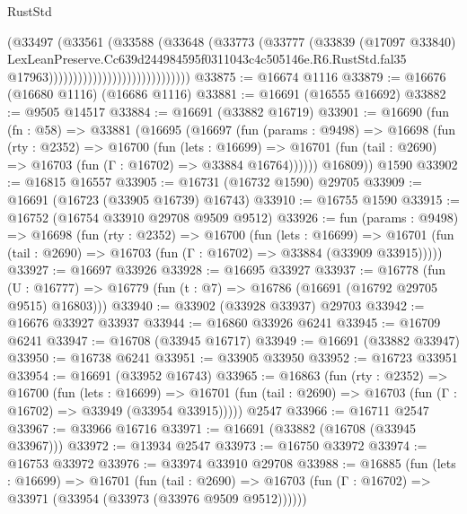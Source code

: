 \begin{lexlean}{RustStd}
\begin{coremodule}
                                                (@33497
                                                  (@33561
                                                    (@33588
                                                      (@33648
                                                        (@33773
                                                          (@33777
                                                            (@33839
                                                              (@17097 @33840)
                                                              LexLeanPreserve.Cc639d244984595f0311043c4c505146e.R6.RustStd.fal35
                                                              @17963)))))))))))))))))))))))))))))
@33875 := @16674 @1116
@33879 := @16676 (@16680 @1116) (@16686 @1116)
@33881 := @16691 (@16555 @16692)
@33882 := @9505 @14517
@33884 := @16691 (@33882 @16719)
@33901 := @16690
    (fun (fn : @58) =>
    @33881
      (@16695
        (@16697
          (fun (params : @9498) =>
          @16698
            (fun (rty : @2352) =>
            @16700
              (fun (lets : @16699) =>
              @16701 (fun (tail : @2690) => @16703 (fun (Γ : @16702) => @33884 @16764))))))
        @16809))
    @1590
@33902 := @16815 @16557
@33905 := @16731 (@16732 @1590) @29705
@33909 := @16691 (@16723 (@33905 @16739) @16743)
@33910 := @16755 @1590
@33915 := @16752 (@16754 @33910 @29708 @9509 @9512)
@33926 := fun (params : @9498) =>
  @16698
    (fun (rty : @2352) =>
    @16700
      (fun (lets : @16699) =>
      @16701 (fun (tail : @2690) => @16703 (fun (Γ : @16702) => @33884 (@33909 @33915)))))
@33927 := @16697 @33926
@33928 := @16695 @33927
@33937 := @16778
    (fun (U : @16777) => @16779 (fun (t : @7) => @16786 (@16691 (@16792 @29705 @9515) @16803)))
@33940 := @33902 (@33928 @33937) @29703
@33942 := @16676 @33927 @33937
@33944 := @16860 @33926 @6241
@33945 := @16709 @6241
@33947 := @16708 (@33945 @16717)
@33949 := @16691 (@33882 @33947)
@33950 := @16738 @6241
@33951 := @33905 @33950
@33952 := @16723 @33951
@33954 := @16691 (@33952 @16743)
@33965 := @16863
    (fun (rty : @2352) =>
    @16700
      (fun (lets : @16699) =>
      @16701 (fun (tail : @2690) => @16703 (fun (Γ : @16702) => @33949 (@33954 @33915)))))
    @2547
@33966 := @16711 @2547
@33967 := @33966 @16716
@33971 := @16691 (@33882 (@16708 (@33945 @33967)))
@33972 := @13934 @2547
@33973 := @16750 @33972
@33974 := @16753 @33972
@33976 := @33974 @33910 @29708
@33988 := @16885
    (fun (lets : @16699) =>
    @16701
      (fun (tail : @2690) =>
      @16703 (fun (Γ : @16702) => @33971 (@33954 (@33973 (@33976 @9509 @9512))))))

\end{coremodule}
\end{lexlean}
